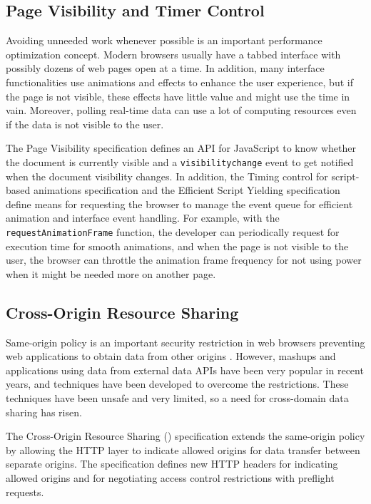 \subsection{Page Visibility and Timer Control}

Avoiding unneeded work whenever possible is an important performance
optimization concept. Modern browsers usually have a tabbed interface
with possibly dozens of web pages open at a time. In addition, many
interface functionalities use animations and effects to enhance the
user experience, but if the page is not visible, these effects have
little value and might use the  time in vain. Moreover,
polling real-time data can use a lot of computing resources even if
the data is not visible to the user.

The Page Visibility specification \cite{PageVisibility} defines an API
for JavaScript to know whether the document is currently visible and a
\texttt{visibilitychange} event to get notified when the document
visibility changes. In addition, the Timing control for script-based
animations specification \cite{TimingControl} and the Efficient Script
Yielding specification \cite{ScriptYielding} define means for
requesting the browser to manage the event queue for efficient
animation and interface event handling. For example, with the
\texttt{requestAnimationFrame} function, the developer can
periodically request for execution time for smooth animations, and
when the page is not visible to the user, the browser can throttle the
animation frame frequency for not using  power when it might
be needed more on another page.

\subsection{Cross-Origin Resource Sharing}

Same-origin policy is an important security restriction in web
browsers preventing web applications to obtain data from other origins
\cite{CORS}. However, mashups and applications using data from
external data APIs have been very popular in recent years, and
techniques have been developed to overcome the restrictions. These
techniques have been unsafe and very limited, so a need for
cross-domain data sharing has risen.

The Cross-Origin Resource Sharing () specification
\cite{CORS} extends the same-origin policy by allowing the HTTP layer
to indicate allowed origins for data transfer between separate
origins. The specification defines new HTTP headers for indicating
allowed origins and for negotiating access control restrictions with
preflight requests.

